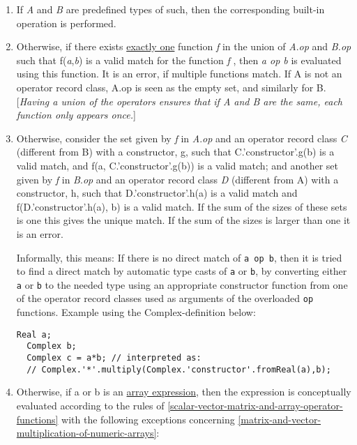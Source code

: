 \begin{enumerate}
\item
  If \emph{A} and \emph{B} are predefined types of such, then the
  corresponding built-in operation is performed.
\item
  Otherwise, if there exists \underline{exactly one} function \emph{f} in the
  union of \emph{A}.\emph{op} and \emph{B.op} such that
  f(\emph{a},\emph{b}) is a valid match for the function \emph{f} , then
  \emph{a op b} is evaluated using this function. It is an error, if
  multiple functions match. If A is not an operator record class, A.op
  is seen as the empty set, and similarly for B. {[}\emph{Having a union
  of the operators ensures that if A and B are the same, each function
  only appears once.}{]}
\item
  Otherwise, consider the set given by \emph{f} in \emph{A}.\emph{op}
  and an operator record class \emph{C} (different from B) with a
  constructor, g, such that C.'constructor'.g(b) is a valid match, and
  f(a, C.'constructor'.g(b)) is a valid match; and another set given by
  \emph{f} in \emph{B}.\emph{op} and an operator record class \emph{D}
  (different from A) with a constructor, h, such that
  D.'constructor'.h(a) is a valid match and f(D.'constructor'.h(a), b)
  is a valid match. If the sum of the sizes of these sets is one this
  gives the unique match. If the sum of the sizes is larger than one it
  is an error.

\begin{nonnormative}
  Informally, this means: If there is no direct match of \lstinline!a op b!, then it is tried to find a direct match by automatic type casts
  of \lstinline!a! or \lstinline!b!, by converting either \lstinline!a! or \lstinline!b! to the needed
  type using an appropriate constructor function from one of the
  operator record classes used as arguments of the overloaded \lstinline!op!
  functions. Example using the Complex-definition below:
\begin{lstlisting}[language=modelica]
   Real a;
  Complex b;
  Complex c = a*b; // interpreted as:
  // Complex.'*'.multiply(Complex.'constructor'.fromReal(a),b);
\end{lstlisting}
\end{nonnormative}

\item
  Otherwise, if a or b is an \underline{array expression}, then the expression is
  conceptually evaluated according to the rules of \autoref{scalar-vector-matrix-and-array-operator-functions} with the
  following exceptions concerning \autoref{matrix-and-vector-multiplication-of-numeric-arrays}:


\end{enumerate}
